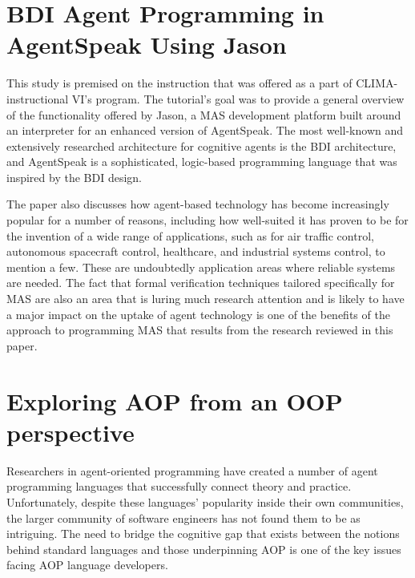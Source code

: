\section{\ac{BDI} Agent Programming in AgentSpeak Using Jason}

This study \cite{jasonBDI} is premised on the instruction that was offered as a part of CLIMA-instructional VI's program. The tutorial's goal was to provide a general overview of the functionality offered by Jason, a \ac{MAS} development platform built around an interpreter for an enhanced version of AgentSpeak. The most well-known and extensively researched architecture for cognitive agents is the \ac{BDI} architecture, and AgentSpeak is a sophisticated, logic-based programming language that was inspired by the \ac{BDI} design.

\vspace{.5cm}

The paper also discusses how agent-based technology has become increasingly popular for a number of reasons, including how well-suited it has proven to be for the invention of a wide range of applications, such as for air traffic control, autonomous spacecraft control, healthcare, and industrial systems control, to mention a few. These are undoubtedly application areas where reliable systems are needed. The fact that formal verification techniques tailored specifically for \ac{MAS} are also an area that is luring much research attention and is likely to have a major impact on the uptake of agent technology is one of the benefits of the approach to programming \ac{MAS} that results from the research reviewed in this paper.


\section{Exploring \ac{AOP} from an \ac{OOP} perspective}

Researchers in agent-oriented programming have created a number of agent programming languages that successfully connect theory and practice. Unfortunately, despite these languages' popularity inside their own communities, the larger community of software engineers has not found them to be as intriguing. The need to bridge the cognitive gap that exists between the notions behind standard languages and those underpinning \ac{AOP} is one of the key issues facing \ac{AOP} language developers. 
 
 \vspace{.5cm}
 
